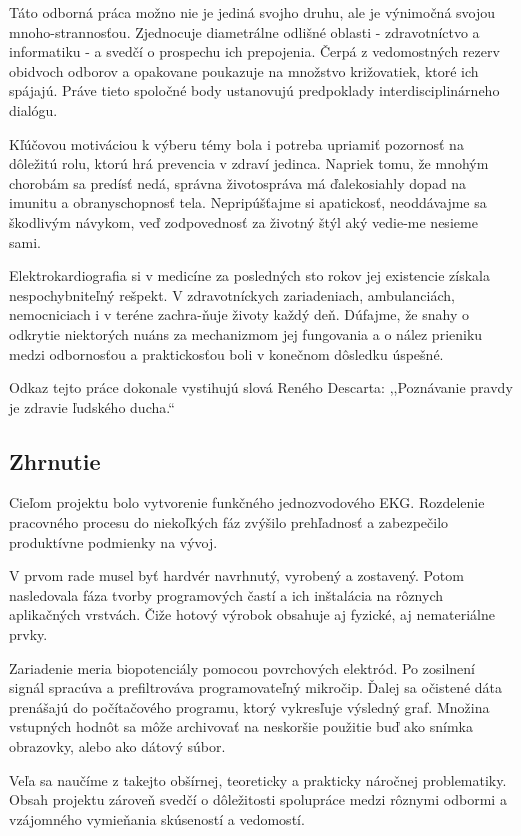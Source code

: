 \documentclass[titlepage,12pt]{article}
\begin{document}
Táto odborná práca možno nie je jediná svojho druhu, ale je výnimočná svojou mnoho-strannosťou. Zjednocuje diametrálne odlišné oblasti - zdravotníctvo a informatiku - a svedčí o prospechu ich prepojenia. Čerpá z vedomostných rezerv obidvoch odborov a opakovane poukazuje na množstvo križovatiek, ktoré ich spájajú. Práve tieto spoločné body ustanovujú predpoklady interdisciplinárneho dialógu.

Kľúčovou motiváciou k výberu témy bola i potreba upriamiť pozornosť na dôležitú rolu, ktorú hrá prevencia v zdraví jedinca. Napriek tomu, že mnohým chorobám sa predísť nedá, správna životospráva má ďalekosiahly dopad na imunitu a obranyschopnosť tela. Nepripúšťajme \linebreak si apatickosť, neoddávajme sa škodlivým návykom, veď zodpovednosť za životný štýl aký vedie-me nesieme sami.

Elektrokardiografia si v medicíne za posledných sto rokov jej existencie získala nespochybniteľný rešpekt. V zdravotníckych zariadeniach, ambulanciách, nemocniciach i v teréne zachra-ňuje životy každý deň. Dúfajme, že snahy o odkrytie niektorých nuáns za mechanizmom jej fungovania a o nález prieniku medzi odbornosťou a praktickosťou boli v konečnom dôsledku úspešné. 

Odkaz tejto práce dokonale vystihujú slová Reného Descarta: ,,Poznávanie pravdy je zdravie ľudského ducha.“

\newpage
\subsection*{Zhrnutie}
Cieľom projektu bolo vytvorenie funkčného jednozvodového EKG. Rozdelenie pracovného procesu do niekoľkých fáz zvýšilo prehľadnosť a zabezpečilo produktívne podmienky na vývoj. 

V prvom rade musel byť hardvér navrhnutý, vyrobený a zostavený. Potom nasledovala fáza tvorby programových častí a ich inštalácia na rôznych aplikačných vrstvách. Čiže hotový výrobok obsahuje aj fyzické, aj nemateriálne prvky.

Zariadenie meria biopotenciály pomocou povrchových elektród. Po zosilnení signál spracúva a prefiltrováva programovateľný mikročip. Ďalej sa očistené dáta prenášajú do počítačového programu, ktorý vykresľuje výsledný graf. Množina vstupných hodnôt sa môže archivovať na neskoršie použitie buď ako snímka obrazovky, alebo ako dátový súbor.

Veľa sa naučíme z takejto obšírnej, teoreticky a prakticky náročnej problematiky. Obsah projektu zároveň svedčí o dôležitosti spolupráce medzi rôznymi odbormi a vzájomného vymieňania skúseností a vedomostí.
\end{document}
